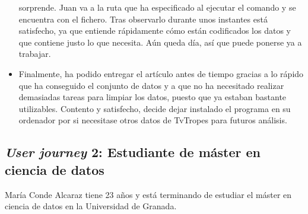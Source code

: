 \begin{itemize}
    sorprende. Juan va a la ruta que ha especificado al ejecutar el comando y se
    encuentra con el fichero. Tras observarlo durante unos instantes está
    satisfecho, ya que entiende rápidamente cómo están codificados los datos y
    que contiene justo lo que necesita. Aún queda día, así que puede ponerse ya
    a trabajar. 
    \item Finalmente, ha podido entregar el artículo antes de tiempo gracias a
    lo rápido que ha conseguido el conjunto de datos y a que no ha necesitado
    realizar demasiadas tareas para limpiar los datos, puesto que ya estaban
    bastante utilizables. Contento y satisfecho, decide dejar instalado el
    programa en su ordenador por si necesitase otros datos de TvTropes para
    futuros análisis.
\end{itemize}

\subsection{\textit{User journey} 2: Estudiante de máster en ciencia de datos}

María Conde Alcaraz tiene 23 años y está terminando de estudiar el máster en
ciencia de datos en la Universidad de Granada.

